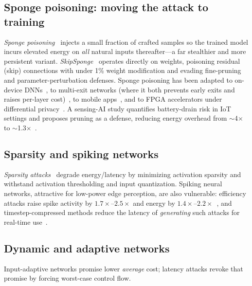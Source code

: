 \documentclass[acmsmall,screen,review,nonacm]{acmart}
\begin{document}
\subsection{Sponge poisoning: moving the attack to training}
\emph{Sponge poisoning}~\cite{cina2022sponge} injects a small fraction of crafted samples so the trained model incurs elevated energy on \emph{all} natural inputs thereafter---a far stealthier and more persistent variant. \emph{SkipSponge}~\cite{telintelo2024skipsponge} operates directly on weights, poisoning residual (skip) connections with under 1\% weight modification and evading fine-pruning and parameter-perturbation defenses. Sponge poisoning has been adapted to on-device DNNs~\cite{wang2023ondevice}, to multi-exit networks (where it both prevents early exits and raises per-layer cost)~\cite{huang2024multiexit}, to mobile apps~\cite{paul2023mobile}, and to FPGA accelerators under differential privacy~\cite{akram2025evoweight}. A sensing-AI study quantifies battery-drain risk in IoT settings and proposes pruning as a defense, reducing energy overhead from $\sim$4$\times$ to $\sim$1.3$\times$~\cite{hasan2025sensing}.

\subsection{Sparsity and spiking networks}
\emph{Sparsity attacks}~\cite{krithivasan2020sparsity} degrade energy/latency by minimizing activation sparsity and withstand activation thresholding and input quantization. Spiking neural networks, attractive for low-power edge perception, are also vulnerable: efficiency attacks raise spike activity by $1.7\times$--$2.5\times$ and energy by $1.4\times$--$2.2\times$~\cite{krithivasan2022spikeattack}, and timestep-compressed methods reduce the latency of \emph{generating} such attacks for real-time use~\cite{kang2025tca}.

\subsection{Dynamic and adaptive networks}
\label{sec:dynamic}

Input-adaptive networks promise lower \emph{average} cost; latency attacks revoke that promise by forcing worst-case control flow.
\end{document}
